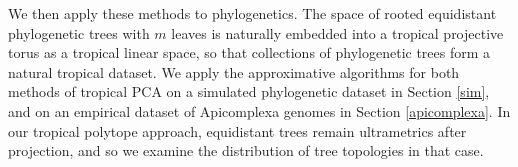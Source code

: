 \documentclass[12pt]{extarticle}
\numberwithin{theorem}{section}
\newcommand{\R}{\mathbb{R}}
\begin{document}
We then apply these methods to phylogenetics. The space of rooted equidistant phylogenetic trees with $m$ leaves is naturally embedded into a tropical projective torus as a tropical linear space, so that collections of phylogenetic trees form a natural tropical dataset. We apply the approximative algorithms for both methods of tropical PCA on a simulated phylogenetic dataset in Section \ref{sim}, and on an empirical dataset of Apicomplexa genomes in Section \ref{apicomplexa}. In our tropical polytope approach, equidistant trees remain ultrametrics after projection, and so we examine the distribution of tree topologies in that case.
\end{document}
